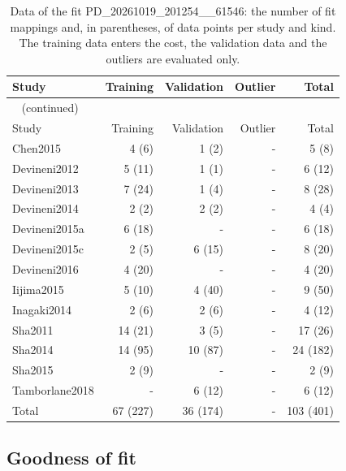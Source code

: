 \documentclass{article}
\begin{document}
\begin{longtable}{lrrrr}
\caption{Data of the fit PD\_20261019\_201254\_\_61546: the number of fit mappings and, in parentheses, of data points per study and kind. The training data enters the cost, the validation data and the outliers are evaluated only.}\label{tab:data:PD_20261019_201254__61546} \\
\toprule
Study & Training & Validation & Outlier & Total \\
\midrule
\endfirsthead
\multicolumn{5}{l}{\small\tablename~\thetable{} (continued)} \\
\toprule
Study & Training & Validation & Outlier & Total \\
\midrule
\endhead
\bottomrule
\endlastfoot
Chen2015 & 4 (6) & 1 (2) & - & 5 (8) \\
Devineni2012 & 5 (11) & 1 (1) & - & 6 (12) \\
Devineni2013 & 7 (24) & 1 (4) & - & 8 (28) \\
Devineni2014 & 2 (2) & 2 (2) & - & 4 (4) \\
Devineni2015a & 6 (18) & - & - & 6 (18) \\
Devineni2015c & 2 (5) & 6 (15) & - & 8 (20) \\
Devineni2016 & 4 (20) & - & - & 4 (20) \\
Iijima2015 & 5 (10) & 4 (40) & - & 9 (50) \\
Inagaki2014 & 2 (6) & 2 (6) & - & 4 (12) \\
Sha2011 & 14 (21) & 3 (5) & - & 17 (26) \\
Sha2014 & 14 (95) & 10 (87) & - & 24 (182) \\
Sha2015 & 2 (9) & - & - & 2 (9) \\
Tamborlane2018 & - & 6 (12) & - & 6 (12) \\
Total & 67 (227) & 36 (174) & - & 103 (401) \\
\end{longtable}

\subsection{Goodness of fit}
\end{document}
